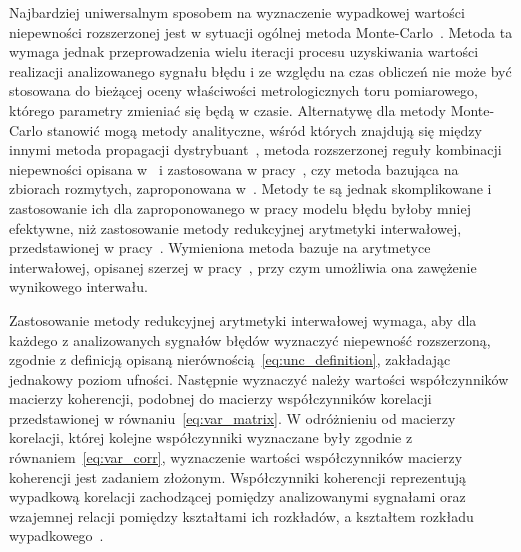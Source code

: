 Najbardziej uniwersalnym sposobem na wyznaczenie wypadkowej wartości niepewności rozszerzonej jest w sytuacji ogólnej metoda Monte-Carlo~\cite{jcgm_montecarlo}. Metoda ta wymaga jednak przeprowadzenia wielu iteracji procesu uzyskiwania wartości realizacji analizowanego sygnału błędu i ze względu na czas obliczeń nie może być stosowana do bieżącej oceny właściwości metrologicznych toru pomiarowego, którego parametry zmieniać się będą w czasie. Alternatywę dla metody Monte-Carlo stanowić mogą metody analityczne, wśród których znajdują się między innymi metoda propagacji dystrybuant~\cite{koliander_fusion, zhang_pdp}, metoda rozszerzonej reguły kombinacji niepewności opisana w~\cite{dieck_measurement} i zastosowana w pracy~\cite{yang_euc}, czy metoda bazująca na zbiorach rozmytych, zaproponowana w~\cite{urbanski_fuzzy}. Metody te są jednak skomplikowane i zastosowanie ich dla zaproponowanego w pracy modelu błędu byłoby mniej efektywne, niż zastosowanie metody redukcyjnej arytmetyki interwałowej, przedstawionej w pracy~\cite{jakubiec_redmono}. Wymieniona metoda bazuje na arytmetyce interwałowej, opisanej szerzej w pracy~\cite{moore_interval}, przy czym umożliwia ona zawężenie wynikowego interwału.

Zastosowanie metody redukcyjnej arytmetyki interwałowej wymaga, aby dla każdego z analizowanych sygnałów błędów wyznaczyć niepewność rozszerzoną, zgodnie z definicją opisaną nierównością~\eqref{eq:unc_definition}, zakładając jednakowy poziom ufności. Następnie wyznaczyć należy wartości współczynników macierzy koherencji, podobnej do macierzy współczynników korelacji przedstawionej w równaniu~\eqref{eq:var_matrix}. W odróżnieniu od macierzy korelacji, której kolejne współczynniki wyznaczane były zgodnie z równaniem~\eqref{eq:var_corr}, wyznaczenie wartości współczynników macierzy koherencji jest zadaniem złożonym. Współczynniki koherencji reprezentują wypadkową korelacji zachodzącej pomiędzy analizowanymi sygnałami oraz wzajemnej relacji pomiędzy kształtami ich rozkładów, a kształtem rozkładu wypadkowego~\cite{jakubiec_system}.

